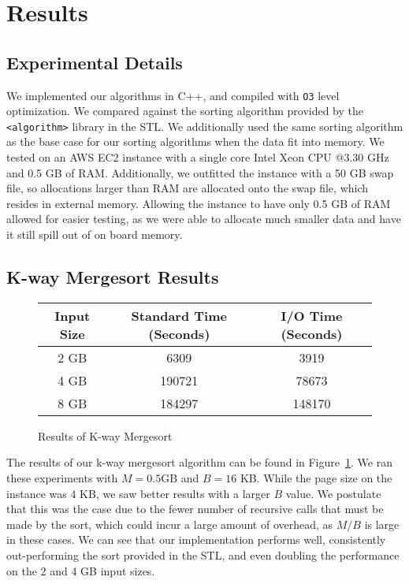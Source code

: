 \documentclass{article}
\begin{document}
\section{Results}

\subsection{Experimental Details}
We implemented our algorithms in C++, and compiled with \texttt{O3} level
optimization.
%
We compared against the sorting algorithm provided by the
\texttt{<algorithm>} library in the STL.
%
We additionally used the same sorting algorithm as the base case for our
sorting algorithms when the data fit into memory.
%
We tested on an AWS EC2 instance with a single core Intel Xeon CPU @3.30 GHz and 0.5 GB of RAM.
%
Additionally, we outfitted the instance with a 50 GB swap file, so allocations
larger than RAM are allocated onto the swap file, which resides in external memory.
%
Allowing the instance to have only 0.5 GB of RAM allowed for easier testing,
as we were able to allocate much smaller data and have it still spill out of
on board memory.

\subsection{K-way Mergesort Results}

\begin{figure}
  \centering
  \begin{tabular}{|c|c|c|}
    \hline
    Input Size & Standard Time (Seconds) & I/O Time (Seconds)\\
    \hline
    \hline
    2 GB & 6309 & 3919 \\
    \hline
    4 GB & 190721 & 78673 \\
    \hline
    8 GB & 184297 & 148170 \\
    \hline
  \end{tabular}
  \caption{Results of K-way Mergesort}
  \label{k-merge-res}
\end{figure}

The results of our k-way mergesort algorithm can be found in Figure~\ref{k-merge-res}.
%
We ran these experiments with $M = 0.5$GB and $B = 16$ KB.
%
While the page size on the instance was $4$ KB, we saw better results with a larger $B$
value.
%
We postulate that this was the case due to the fewer number of recursive calls that must be
made by the sort, which could incur a large amount of overhead, as $M/B$ is large in these cases.
%
We can see that our implementation performs well, consistently out-performing the sort
provided in the STL, and even doubling the performance on the 2 and 4 GB input sizes.
\end{document}
